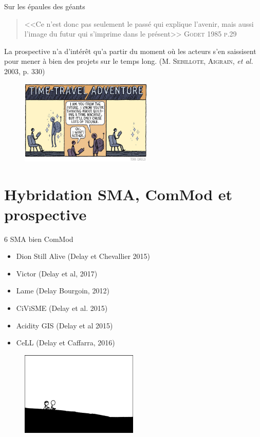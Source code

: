 \documentclass[newPxFont]{beamer}
\begin{document}
\begin{frame}[c]{Sur les épaules des géants}
  \vspace{-2em}
  \begin{quote}
    <<Ce n'est donc pas seulement le passé qui explique l'avenir, mais aussi l'image du futur qui s'imprime dans le présent>>
    \hspace*{\fill}\textsc{Godet 1985 p.29}
  \end{quote}
  La prospective n'a d'intérêt qu'a partir du moment où les acteurs s'en saissisent pour mener à bien des projets sur le temps long. (\textsc{M. Sebillote, Aigrain}, \textit{et al.} 2003, p. 330)
  \begin{figure}
   \includegraphics[height=4cm]{img/a_thom_gauld_futureMachine.jpg}
  \end{figure}
\end{frame}
%
%
\section{Hybridation SMA, ComMod et prospective}

\begin{frame}[c]{6 SMA bien ComMod}
  \vspace{-2em}
  \begin{itemize}
    \item Dion Still Alive (Delay et Chevallier 2015)
    \item Victor (Delay et al, 2017)
    \item Lame (Delay Bourgoin, 2012)
    \item CiViSME (Delay et al. 2015)
    \item Acidity GIS (Delay et al 2015)
    \item CeLL (Delay et Caffarra, 2016)
  \end{itemize}
  \begin{figure}
   \includegraphics[height=4cm]{img/a_contemplation.png}
  \end{figure}
\end{frame}
\end{document}
